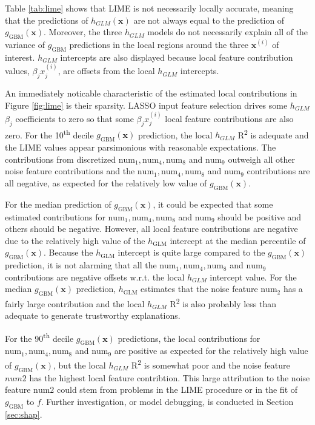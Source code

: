 \documentclass[11pt]{asaproc}
\begin{document}
Table \ref{tab:lime} shows that LIME is not necessarily locally accurate, meaning that the predictions of $h_{GLM}(\mathbf{x})$ are not always equal to the prediction of $g_{\text{GBM}}(\mathbf{x})$. Moreover, the three $h_{GLM}$ models do not necessarily explain all of the variance of $g_{\text{GBM}}$ predictions in the local regions around the three $\mathbf{x}^{(i)}$ of interest. $h_{GLM}$ intercepts are also displayed because local feature contribution values, $\beta_j x_j^{(i)}$, are offsets from the local $h_{GLM}$ intercepts.

An immediately noticable characteristic of the estimated local contributions in Figure \ref{fig:lime} is their sparsity. LASSO input feature selection drives some $h_{GLM}$ $\beta_j$ coefficients to zero so that some $\beta_j x_j^{(i)}$ local feature contributions are also zero. For the 10\textsuperscript{th} decile $g_{\text{GBM}}(\mathbf{x})$ prediction, the local $h_{GLM}$ R\textsuperscript{2} is adequate and the LIME values appear parsimonious with reasonable expectations. The contributions from discretized $\text{num}_1, \text{num}_4, \text{num}_8$ and $\text{num}_9$ outweigh all other noise feature contributions and the $\text{num}_1, \text{num}_4, \text{num}_8$ and $\text{num}_9$ contributions are all negative, as expected for the relatively low value of $g_{\text{GBM}}(\mathbf{x})$. 

For the median prediction of $g_{\text{GBM}}(\mathbf{x})$, it could be expected that some estimated contributions for $\text{num}_1, \text{num}_4, \text{num}_8$ and $\text{num}_9$ should be positive and others should be negative. However, all local feature contributions are negative due to the relatively high value of the $h_{\text{GLM}}$ intercept at the median percentile of $g_{\text{GBM}}(\mathbf{x})$. Because the $h_{\text{GLM}}$ intercept is quite large compared to the $g_{\text{GBM}}(\mathbf{x})$ prediction, it is not alarming that all the $\text{num}_1, \text{num}_4, \text{num}_8$ and $\text{num}_9$ contributions are negative offsets w.r.t. the local $h_{GLM}$ intercept value. For the median $g_{\text{GBM}}(\mathbf{x})$ prediction, $h_{\text{GLM}}$ estimates that the noise feature $\text{num}_2$ has a fairly large contribution and the local $h_{GLM}$ R\textsuperscript{2} is also probably less than adequate to generate trustworthy explanations.

For the 90\textsuperscript{th} decile $g_{\text{GBM}}(\mathbf{x})$ predictions, the local contributions for $\text{num}_1, \text{num}_4, \text{num}_8$ and $\text{num}_9$ are positive as expected for the relatively high value of $g_{\text{GBM}}(\mathbf{x})$, but the local $h_{GLM}$ R\textsuperscript{2} is somewhat poor and the noise feature $num2$ has the highest local feature contribtion. This large attribution to the noise feature $\text{num}2$ could stem from problems in the LIME procedure or in the fit of $g_{\text{GBM}}$ to $f$. Further investigation, or model debugging, is conducted in Section \ref{sec:shap}.
\end{document}
